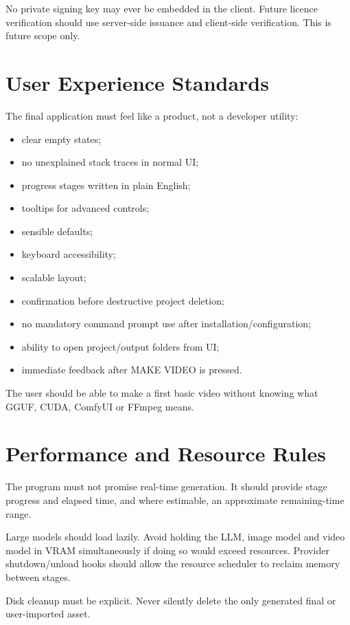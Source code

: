 \documentclass[10pt,journal,compsoc]{IEEEtran}
\begin{document}
No private signing key may ever be embedded in the client. Future licence verification should use server-side issuance and client-side verification. This is future scope only.

\section{User Experience Standards}

The final application must feel like a product, not a developer utility:
\begin{itemize}
    \item clear empty states;
    \item no unexplained stack traces in normal UI;
    \item progress stages written in plain English;
    \item tooltips for advanced controls;
    \item sensible defaults;
    \item keyboard accessibility;
    \item scalable layout;
    \item confirmation before destructive project deletion;
    \item no mandatory command prompt use after installation/configuration;
    \item ability to open project/output folders from UI;
    \item immediate feedback after MAKE VIDEO is pressed.
\end{itemize}

The user should be able to make a first basic video without knowing what GGUF, CUDA, ComfyUI or FFmpeg means.

\section{Performance and Resource Rules}

The program must not promise real-time generation. It should provide stage progress and elapsed time, and where estimable, an approximate remaining-time range.

Large models should load lazily. Avoid holding the LLM, image model and video model in VRAM simultaneously if doing so would exceed resources. Provider shutdown/unload hooks should allow the resource scheduler to reclaim memory between stages.

Disk cleanup must be explicit. Never silently delete the only generated final or user-imported asset.
\end{document}
